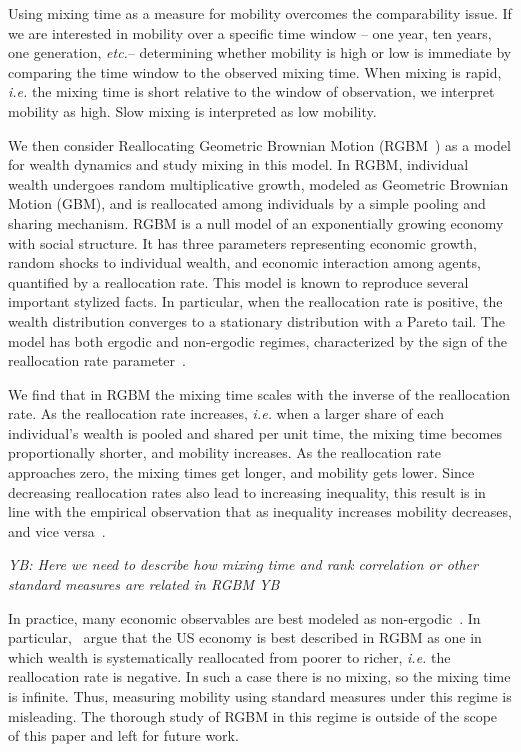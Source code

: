 \documentclass[11pt]{article}
\newcommand{\blue}[1]{{\color{blue} #1}}
\newcommand{\ie}{{\it i.e.}\xspace}
\newcommand{\etc}{{\it etc.}\xspace}
\newcommand{\YB}[1]{\blue{{\it YB: #1 YB}}}
\numberwithin{equation}{section}
\begin{document}
Using mixing time as a measure for mobility overcomes the comparability issue. If we are interested in mobility over a specific time window -- one year, ten years, one generation, \etc -- determining whether mobility is high or low is immediate by comparing the time window to the observed mixing time. When mixing is rapid, \ie the mixing time is short relative to the window of observation, we interpret mobility as high. Slow mixing is interpreted as low mobility.

We then consider Reallocating Geometric Brownian Motion (RGBM~\citep{MarsiliMaslovZhang1998,LiuSerota2017,BermanPetersAdamou2019}) as a model for wealth dynamics and study mixing in this model. In RGBM, individual wealth undergoes random multiplicative growth, modeled as Geometric Brownian Motion (GBM), and is reallocated among individuals by a simple pooling and sharing mechanism. RGBM is a null model of an exponentially growing economy with social structure. It has three parameters representing economic growth, random shocks to individual wealth, and economic interaction among agents, quantified by a reallocation rate. This model is known to reproduce several important stylized facts. In particular, when the reallocation rate is positive, the wealth distribution converges to a stationary distribution with a Pareto tail. The model has both ergodic and non-ergodic regimes, characterized by the sign of the reallocation rate parameter~\citep{BermanPetersAdamou2019}.

We find that in RGBM the mixing time scales with the inverse of the reallocation rate. As the reallocation rate increases, \ie when a larger share of each individual's wealth is pooled and shared per unit time, the mixing time becomes proportionally shorter, and mobility increases. As the reallocation rate approaches zero, the mixing times get longer, and mobility gets lower. Since decreasing reallocation rates also lead to increasing inequality, this result is in line with the empirical observation that as inequality increases mobility decreases, and vice versa~\citep{corak2013}.

\YB{Here we need to describe how mixing time and rank correlation or other standard measures are related in RGBM}

In practice, many economic observables are best modeled as non-ergodic~\citep{Peters2019b}. In particular,~\citet{BermanPetersAdamou2019} argue that the US economy is best described in RGBM as one in which wealth is systematically reallocated from poorer to richer, \ie the reallocation rate is negative. In such a case there is no mixing, so the mixing time is infinite. Thus, measuring mobility using standard measures under this regime is misleading. The thorough study of RGBM in this regime is outside of the scope of this paper and left for future work.  
\end{document}
